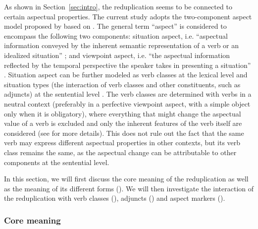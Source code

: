 As shown in Section~\ref{sec:intro}, the reduplication seems to be connected to certain aspectual properties.
The current study adopts the two-component aspect model proposed by \citet{XiaoMcEnery2004} based on \citet{Smith1991}.
The general term ``aspect'' is considered to encompass the following two components:
situation aspect, i.e. ``aspectual information conveyed by the inherent semantic representation of a verb or an idealized situation'' \citep[21]{XiaoMcEnery2004};
and viewpoint aspect, i.e. ``the aspectual information reflected by the temporal perspective the speaker takes in presenting a situation'' \citep[21]{XiaoMcEnery2004}.
Situation aspect can be further modeled as verb classes  at the lexical level
and situation types (the interaction of verb classes and other constituents, such as adjuncts) at the sentential level \citep[33]{XiaoMcEnery2004}.
The verb classes are determined with verbs in a neutral context (preferably in a perfective viewpoint aspect, with a simple object only when it is obligatory),
where everything that might change the aspectual value of a verb is excluded
and only the inherent features of the verb itself are considered
(see \citealt[52]{XiaoMcEnery2004} for more details).
This does not rule out the fact that the same verb may express different aspectual properties in other contexts,
but its verb class remains the same,
as the aspectual change can be attributable to other components at the sentential level.

In this section, we will first discuss the core meaning of the reduplication as well as the meaning of its different forms ().
We will then investigate the interaction of the reduplication with verb classes (), adjuncts () and aspect markers ().

\subsubsection{Core meaning}\label{sec:core-sem}

